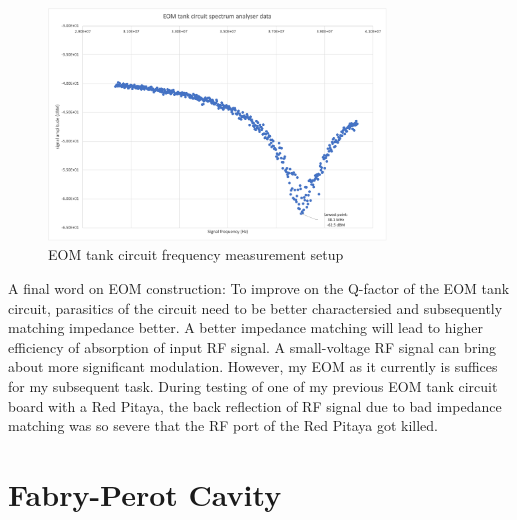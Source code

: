 \documentclass[12pt]{report}
\begin{document}
\begin{figure}[H]
    \centering
    \includegraphics[width=0.8\textwidth]{EOMfrequencyMeasurement.png}
    \caption{EOM tank circuit frequency measurement setup}
    \label{fig:EOMfrequencyMeasurement}
\end{figure}

A final word on EOM construction: To improve on the Q-factor of the EOM tank circuit, parasitics of the circuit need to be better charactersied and subsequently matching impedance better. A better impedance matching will lead to higher efficiency of absorption of input RF signal. A small-voltage RF signal can bring about more significant modulation. However, my EOM as it currently is suffices for my subsequent task. During testing of one of my previous EOM tank circuit board with a Red Pitaya, the back reflection of RF signal due to bad impedance matching was so severe that the RF port of the Red Pitaya got killed. 

\section{Fabry-Perot Cavity}
\end{document}
